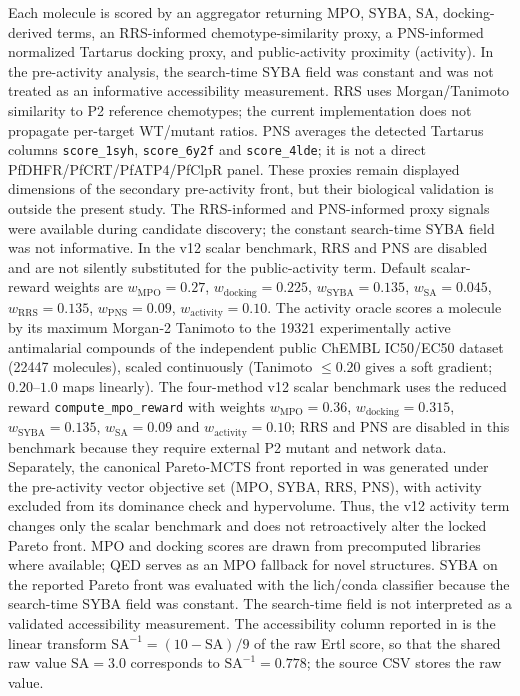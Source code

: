 \documentclass[10pt,a4paper]{article}
\begin{document}
Each molecule is scored by an aggregator returning MPO, SYBA, SA, docking-derived terms, an RRS-informed chemotype-similarity proxy, a PNS-informed normalized Tartarus docking proxy, and public-activity proximity (activity). In the pre-activity analysis, the search-time SYBA field was constant and was not treated as an informative accessibility measurement. RRS uses Morgan/Tanimoto similarity to P2 reference chemotypes; the current implementation does not propagate per-target WT/mutant ratios. PNS averages the detected Tartarus columns \texttt{score\_1syh}, \texttt{score\_6y2f} and \texttt{score\_4lde}; it is not a direct PfDHFR/PfCRT/PfATP4/PfClpR panel. These proxies remain displayed dimensions of the secondary pre-activity front, but their biological validation is outside the present study. The RRS-informed and PNS-informed proxy signals were available during candidate discovery; the constant search-time SYBA field was not informative. In the v12 scalar benchmark, RRS and PNS are disabled and are not silently substituted for the public-activity term. Default scalar-reward weights are $w_{\text{MPO}}=\num{0.27}$, $w_{\text{docking}}=\num{0.225}$, $w_{\text{SYBA}}=\num{0.135}$, $w_{\text{SA}}=\num{0.045}$, $w_{\text{RRS}}=\num{0.135}$, $w_{\text{PNS}}=\num{0.09}$, $w_{\text{activity}}=\num{0.10}$. The activity oracle scores a molecule by its maximum Morgan-2 Tanimoto to the \num{19321} experimentally active antimalarial compounds of the independent public ChEMBL IC50/EC50 dataset (\num{22447} molecules), scaled continuously (Tanimoto $\le \num{0.20}$ gives a soft gradient; $\num{0.20}$--$\num{1.0}$ maps linearly). The four-method v12 scalar benchmark uses the reduced reward \texttt{compute\_mpo\_reward} with weights $w_{\text{MPO}}=\num{0.36}$, $w_{\text{docking}}=\num{0.315}$, $w_{\text{SYBA}}=\num{0.135}$, $w_{\text{SA}}=\num{0.09}$ and $w_{\text{activity}}=\num{0.10}$; RRS and PNS are disabled in this benchmark because they require external P2 mutant and network data. Separately, the canonical Pareto-MCTS front reported in  was generated under the pre-activity vector objective set (MPO, SYBA, RRS, PNS), with activity excluded from its dominance check and hypervolume. Thus, the v12 activity term changes only the scalar benchmark and does not retroactively alter the locked Pareto front. MPO and docking scores are drawn from precomputed libraries where available; QED serves as an MPO fallback for novel structures. SYBA on the reported Pareto front was evaluated with the lich/conda classifier because the search-time SYBA field was constant. The search-time field is not interpreted as a validated accessibility measurement. The accessibility column reported in  is the linear transform $\mathrm{SA}^{-1} = (10 - \mathrm{SA})/9$ of the raw Ertl score, so that the shared raw value $\mathrm{SA} = \num{3.0}$ corresponds to $\mathrm{SA}^{-1} = \num{0.778}$; the source CSV stores the raw value.
\end{document}

